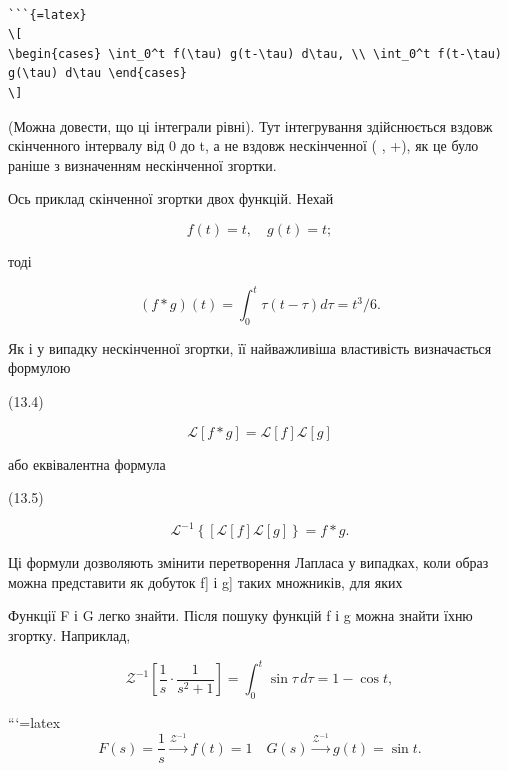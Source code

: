 \documentclass[
  ukrainian,
]{article}
\begin{document}
\begin{verbatim}

```{=latex}
\[
\begin{cases} \int_0^t f(\tau) g(t-\tau) d\tau, \\ \int_0^t f(t-\tau) g(\tau) d\tau \end{cases}
\]
\end{verbatim}

(Можна довести, що ці інтеграли рівні). Тут інтегрування здійснюється
вздовж скінченного інтервалу від 0 до t, а не вздовж нескінченної (
\infty , +\infty ), як це було раніше з визначенням нескінченної
згортки.

Ось приклад скінченної згортки двох функцій. Нехай

\[
f(t) = t, \quad g(t) = t;
\]

тоді

\[
(f * g)(t) = \int_{0}^{t} \tau(t - \tau) d\tau = t^{3}/6.
\]

Як і у випадку нескінченної згортки, її найважливіша властивість
визначається формулою

(13.4)

\[
\mathscr{L}[f * g] = \mathscr{L}[f] \mathscr{L}[g]
\]

або еквівалентна формула

(13.5)

\[
\mathscr{L}^{-1}\left\{ \left[\mathscr{L}\left[f\right]\mathscr{L}\left[g\right]\right\} = f*g. \right.
\]

Ці формули дозволяють змінити перетворення Лапласа у випадках, коли
образ можна представити як добуток \mathscr{L}{[}f{]} і
\mathscr{L}{[}g{]} таких множників, для яких

Функції F і G легко знайти. Після пошуку функцій f і g можна знайти їхню
згортку. Наприклад,

\[
\mathcal{Z}^{-1}\left[\frac{1}{s} \cdot \frac{1}{s^2+1}\right] = \int_0^t \sin \tau \, d\tau = 1 - \cos t,
\]

```{=latex}
\[
F(s) = \frac{1}{s} \xrightarrow{\mathcal{Z}^{-1}} f(t) = 1 \quad G(s) \xrightarrow{\mathcal{Z}^{-1}} g(t) = \sin t.
\]
\end{document}
